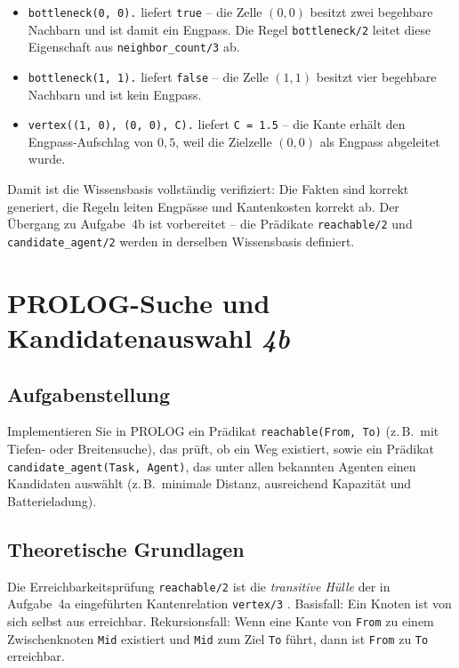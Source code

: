 \begin{itemize}
    \item \texttt{bottleneck(0, 0).} liefert \texttt{true} -- die Zelle $(0,0)$ besitzt zwei begehbare Nachbarn und ist damit ein Engpass. Die Regel \texttt{bottleneck/2} leitet diese Eigenschaft aus \texttt{neighbor\_count/3} ab.
    \item \texttt{bottleneck(1, 1).} liefert \texttt{false} -- die Zelle $(1,1)$ besitzt vier begehbare Nachbarn und ist kein Engpass.
    \item \texttt{vertex((1, 0), (0, 0), C).} liefert \texttt{C = 1.5} -- die Kante erhält den Engpass-Aufschlag von $0{,}5$, weil die Zielzelle $(0,0)$ als Engpass abgeleitet wurde.
\end{itemize}

Damit ist die Wissensbasis vollständig verifiziert: Die Fakten sind korrekt generiert, die Regeln leiten Engpässe und Kantenkosten korrekt ab. Der Übergang zu Aufgabe~4b ist vorbereitet -- die Prädikate \texttt{reachable/2} und \texttt{candidate\_agent/2} werden in derselben Wissensbasis definiert.


\section{\acs{PROLOG}-Suche und Kandidatenauswahl \textit{4b}}
\label{sec:aufgabe4b}

\subsection{Aufgabenstellung}

Implementieren Sie in \acs{PROLOG} ein Prädikat \texttt{reachable(From, To)} (z.\,B.\ mit Tiefen- oder Breitensuche), das prüft, ob ein Weg existiert, sowie ein Prädikat \texttt{candidate\_agent(Task, Agent)}, das unter allen bekannten Agenten einen Kandidaten auswählt (z.\,B.\ minimale Distanz, ausreichend Kapazität und Batterieladung).

\subsection{Theoretische Grundlagen}

Die Erreichbarkeitsprüfung \texttt{reachable/2} ist die \textit{transitive Hülle} der in Aufgabe~4a eingeführten Kantenrelation \texttt{vertex/3} \cite[S. 70]{4}. Basisfall: Ein Knoten ist von sich selbst aus erreichbar. Rekursionsfall: Wenn eine Kante von \texttt{From} zu einem Zwischenknoten \texttt{Mid} existiert und \texttt{Mid} zum Ziel \texttt{To} führt, dann ist \texttt{From} zu \texttt{To} erreichbar.

